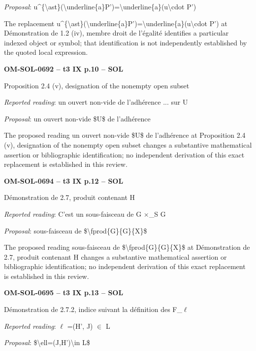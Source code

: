 \emph{Proposal}: u\textasciicircum{}\{\textbackslash{}ast\}(\textbackslash{}underline\{a\}P')=\allowbreak \textbackslash{}underline\{a\}(u\textbackslash{}cdot P')\par
The replacement u\textasciicircum{}\{\textbackslash{}ast\}(\textbackslash{}underline\{a\}P')=\allowbreak \textbackslash{}underline\{a\}(u\textbackslash{}cdot P') at Démonstration de 1.2 (iv), membre droit de l'égalité identifies a particular indexed object or symbol; that identification is not independently established by the quoted local expression.\par
\par\noindent\textbf{OM-SOL-0692 -- t3 IX p.10 -- SOL}\par
Proposition 2.4 (v), designation of the nonempty open subset\par
\emph{Reported reading}: un ouvert non-vide de l'adhérence ... sur U\par
\emph{Proposal}: un ouvert non-vide \$U\$ de l'adhérence\par
The proposed reading un ouvert non-vide \$U\$ de l'adhérence at Proposition 2.4 (v), designation of the nonempty open subset changes a substantive mathematical assertion or bibliographic identification; no independent derivation of this exact replacement is established in this review.\par
\par\noindent\textbf{OM-SOL-0694 -- t3 IX p.12 -- SOL}\par
Démonstration de 2.7, produit contenant H\par
\emph{Reported reading}: C'est un sous-faisceau de G \ensuremath{\times}\_S G\par
\emph{Proposal}: sous-faisceau de \$\textbackslash{}fprod\{G\}\{G\}\{X\}\$\par
The proposed reading sous-faisceau de \$\textbackslash{}fprod\{G\}\{G\}\{X\}\$ at Démonstration de 2.7, produit contenant H changes a substantive mathematical assertion or bibliographic identification; no independent derivation of this exact replacement is established in this review.\par
\par\noindent\textbf{OM-SOL-0695 -- t3 IX p.13 -- SOL}\par
Démonstration de 2.7.2, indice suivant la définition des F\_\ensuremath{\ell}\par
\emph{Reported reading}: \ensuremath{\ell} =\allowbreak  (H', J) \ensuremath{\in} L\par
\emph{Proposal}: \$\textbackslash{}ell=\allowbreak (J,H')\textbackslash{}in L\$\par
